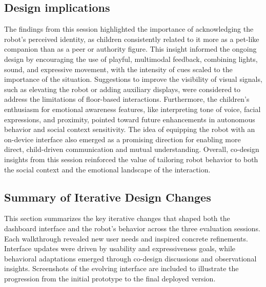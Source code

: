 \documentclass[a4paper]{usiinfbachelorproject}
\begin{document}
\subsection*{\textbf{Design implications}}
The findings from this session highlighted the importance of acknowledging the robot's perceived identity, as children consistently related to it more as a pet-like companion than as a peer or authority figure.
This insight informed the ongoing design by encouraging the use of playful, multimodal feedback, combining lights, sound, and expressive movement, with the intensity of cues scaled to the importance of the situation.
Suggestions to improve the visibility of visual signals, such as elevating the robot or adding auxiliary displays, were considered to address the limitations of floor-based interactions.
Furthermore, the children's enthusiasm for emotional awareness features, like interpreting tone of voice, facial expressions, and proximity, pointed toward future enhancements in autonomous behavior and social context sensitivity.
The idea of equipping the robot with an on-device interface also emerged as a promising direction for enabling more direct, child-driven communication and mutual understanding.
Overall, co-design insights from this session reinforced the value of tailoring robot behavior to both the social context and the emotional landscape of the interaction.

\subsection{\textbf{Summary of Iterative Design Changes}}
This section summarizes the key iterative changes that shaped both the dashboard interface and the robot's behavior across the three evaluation sessions.
Each walkthrough revealed new user needs and inspired concrete refinements.
Interface updates were driven by usability and expressiveness goals, while behavioral adaptations emerged through co-design discussions and observational insights.
Screenshots of the evolving interface are included to illustrate the progression from the initial prototype to the final deployed version.
\end{document}
